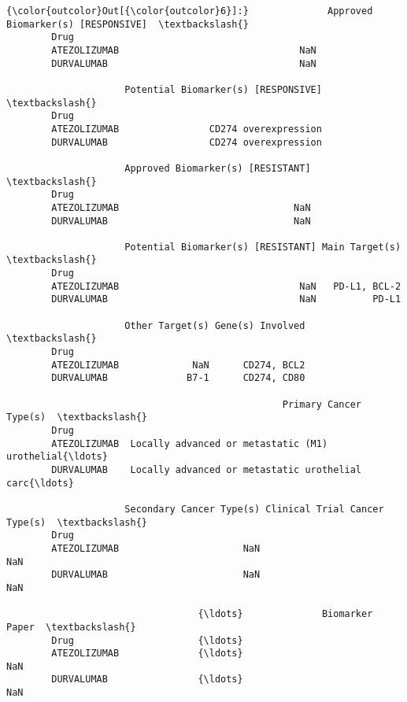 \documentclass[11pt]{article}
\begin{document}
\begin{Verbatim}[commandchars=\\\{\}]
{\color{outcolor}Out[{\color{outcolor}6}]:}              Approved Biomarker(s) [RESPONSIVE]  \textbackslash{}
        Drug                                              
        ATEZOLIZUMAB                                NaN   
        DURVALUMAB                                  NaN   
        
                     Potential Biomarker(s) [RESPONSIVE]  \textbackslash{}
        Drug                                               
        ATEZOLIZUMAB                CD274 overexpression   
        DURVALUMAB                  CD274 overexpression   
        
                     Approved Biomarker(s) [RESISTANT]  \textbackslash{}
        Drug                                             
        ATEZOLIZUMAB                               NaN   
        DURVALUMAB                                 NaN   
        
                     Potential Biomarker(s) [RESISTANT] Main Target(s)  \textbackslash{}
        Drug                                                             
        ATEZOLIZUMAB                                NaN   PD-L1, BCL-2   
        DURVALUMAB                                  NaN          PD-L1   
        
                     Other Target(s) Gene(s) Involved  \textbackslash{}
        Drug                                            
        ATEZOLIZUMAB             NaN      CD274, BCL2   
        DURVALUMAB              B7-1      CD274, CD80   
        
                                                 Primary Cancer Type(s)  \textbackslash{}
        Drug                                                              
        ATEZOLIZUMAB  Locally advanced or metastatic (M1) urothelial{\ldots}   
        DURVALUMAB    Locally advanced or metastatic urothelial carc{\ldots}   
        
                     Secondary Cancer Type(s) Clinical Trial Cancer Type(s)  \textbackslash{}
        Drug                                                                  
        ATEZOLIZUMAB                      NaN                           NaN   
        DURVALUMAB                        NaN                           NaN   
        
                                  {\ldots}              Biomarker Paper  \textbackslash{}
        Drug                      {\ldots}                                
        ATEZOLIZUMAB              {\ldots}                          NaN   
        DURVALUMAB                {\ldots}                          NaN   
        

\end{Verbatim}
\end{document}
